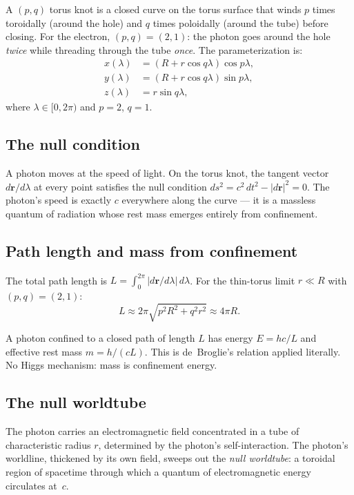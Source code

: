 \documentclass[10pt,twoside,a5paper]{article}
\begin{document}
A $(p,q)$ torus knot is a closed curve on the torus surface that winds $p$ times toroidally (around the hole) and $q$ times poloidally (around the tube) before closing. For the electron, $(p,q) = (2,1)$: the photon goes around the hole \emph{twice} while threading through the tube \emph{once}. The parameterization is:
\begin{align}
  x(\lambda) &= (R + r\cos q\lambda)\cos p\lambda, \\
  y(\lambda) &= (R + r\cos q\lambda)\sin p\lambda, \\
  z(\lambda) &= r\sin q\lambda,
\end{align}
where $\lambda \in [0, 2\pi)$ and $p = 2$, $q = 1$.

\subsection{The null condition}

A photon moves at the speed of light. On the torus knot, the tangent vector $d\mathbf{r}/d\lambda$ at every point satisfies the null condition $ds^2 = c^2\,dt^2 - |d\mathbf{r}|^2 = 0$. The photon's speed is exactly $c$ everywhere along the curve --- it is a massless quantum of radiation whose rest mass emerges entirely from confinement.

\subsection{Path length and mass from confinement}

The total path length is $L = \int_0^{2\pi}|d\mathbf{r}/d\lambda|\,d\lambda$. For the thin-torus limit $r \ll R$ with $(p,q) = (2,1)$:
\begin{equation}
  L \approx 2\pi\sqrt{p^2 R^2 + q^2 r^2} \approx 4\pi R.
\end{equation}

A photon confined to a closed path of length $L$ has energy $E = hc/L$ and effective rest mass $m = h/(cL)$. This is de~Broglie's relation applied literally. No Higgs mechanism: mass is confinement energy.

\subsection{The null worldtube}

The photon carries an electromagnetic field concentrated in a tube of characteristic radius $r$, determined by the photon's self-interaction. The photon's worldline, thickened by its own field, sweeps out the \emph{null worldtube}: a toroidal region of spacetime through which a quantum of electromagnetic energy circulates at~$c$.
\end{document}
